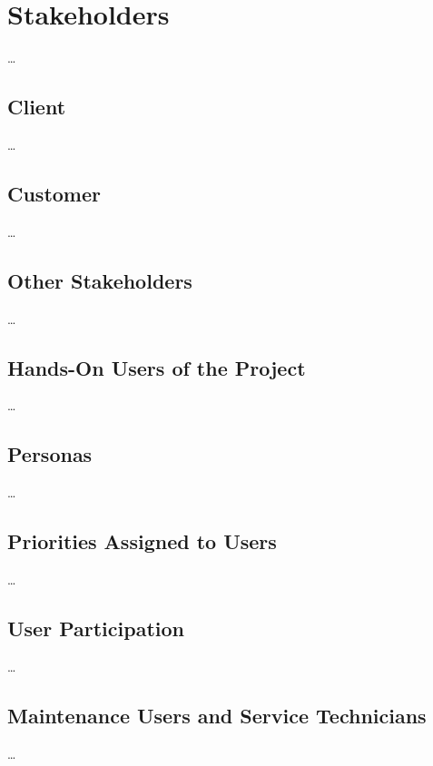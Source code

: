 \section{Stakeholders}

\dots

\subsection{Client}

\dots

\subsection{Customer}

\dots

\subsection{Other Stakeholders}

\dots

\subsection{Hands-On Users of the Project}

\dots

\subsection{Personas}

\dots

\subsection{Priorities Assigned to Users}

\dots

\subsection{User Participation}

\dots

\subsection{Maintenance Users and Service Technicians}

\dots
